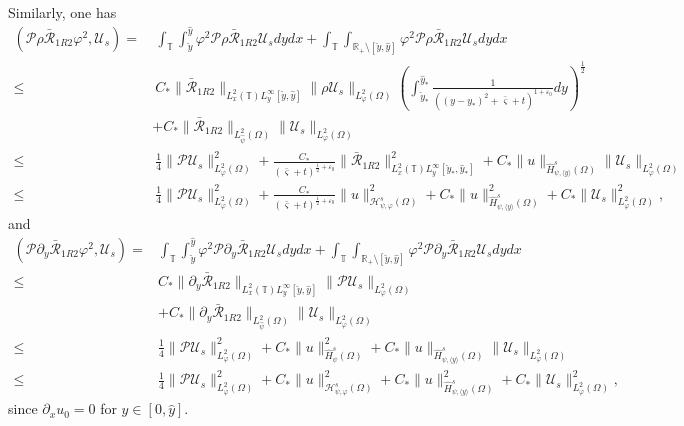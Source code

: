 \documentclass{amsart}
\numberwithin{equation}{section}
\newcommand\y{{{\langle y \rangle}}}
\begin{document}
Similarly, one has
\begin{align}\label{I681}
(\mathcal{P}\rho\bar{\mathcal{R}}_{1R2}\varphi^{2},\mathcal{U}_{s})
=&~\int_{\mathbb{T}}\int_{\check{y}}^{\hat{y}}\varphi^{2}\mathcal{P}\rho\bar{\mathcal{R}}_{1R2}\mathcal{U}_{s}dydx
  +\int_{\mathbb{T}}\int_{\mathbb{R}_{+}\setminus[\check{y},\hat{y}]}\varphi^{2}\mathcal{P}\rho\bar{\mathcal{R}}_{1R2}\mathcal{U}_{s}dydx\\
\leq&~C_{*}\|\bar{\mathcal{R}}_{1R2}\|_{L^{2}_{x}(\mathbb{T})L^{\infty}_{y}[\check{y},\hat{y}]}\|\rho\mathcal{U}_{s}\|_{L_{\varphi}^{2}(\Omega)}
       \left(\int_{\check{y}_{*}}^{\hat{y}_{*}}\frac{1}{((y-y_{*})^2+\bar{\varsigma}+t)^{1+\varepsilon_{0}}}dy\right)^{\frac{1}{2}}\nonumber\\
    &+C_{*}\|\bar{\mathcal{R}}_{1R2}\|_{L_{\hat{\psi}}^{2}(\Omega)}\|\mathcal{U}_{s}\|_{L_{\varphi}^{2}(\Omega)}\nonumber\\
\leq&~\frac{1}{4}\|\mathcal{P}\mathcal{U}_{s}\|_{L_{\varphi}^{2}(\Omega)}^{2}
     +\frac{C_{*}}{(\bar{\varsigma}+t)^{\frac{1}{2}+\varepsilon_{0}}}\|\bar{\mathcal{R}}_{1R2}\|_{L_{x}^{2}(\mathbb{T})L_{y}^{\infty}[\check{y}_{*},\hat{y}_{*}]}^{2}
     +C_{*}\|u\|_{\hat{H}_{\psi,\y}^{s}(\Omega)}\|\mathcal{U}_{s}\|_{L_{\varphi}^{2}(\Omega)}\nonumber\\
\leq&~\frac{1}{4}\|\mathcal{P}\mathcal{U}_{s}\|_{L_{\varphi}^{2}(\Omega)}^{2}
     +\frac{C_{*}}{(\bar{\varsigma}+t)^{\frac{1}{2}+\varepsilon_{0}}}\|u\|_{\mathcal{H}_{\psi,\varphi}^{s}(\Omega)}^{2}
     +C_{*}\|u\|_{\hat{H}_{\psi,\y}^{s}(\Omega)}^{2}
     +C_{*}\|\mathcal{U}_{s}\|_{L_{\varphi}^{2}(\Omega)}^{2}\nonumber,
\end{align}
and
\begin{align}\label{I682}
(\mathcal{P}\partial_{y}\bar{\mathcal{R}}_{1R2}\varphi^{2},\mathcal{U}_{s})
=& \int_{\mathbb{T}}\int_{\check{y}}^{\hat{y}}\varphi^{2}\mathcal{P}\partial_{y}\bar{\mathcal{R}}_{1R2}\mathcal{U}_{s}dydx
  +\int_{\mathbb{T}}\int_{\mathbb{R}_{+}\setminus[\check{y},\hat{y}]}\varphi^{2}\mathcal{P}\partial_{y}\bar{\mathcal{R}}_{1R2}\mathcal{U}_{s}dydx\\
\leq& C_{*}\|\partial_{y}\bar{\mathcal{R}}_{1R2}\|_{L^{2}_{x}(\mathbb{T})L^{\infty}_{y}[\check{y},\hat{y}]}
           \|\mathcal{P}\mathcal{U}_{s}\|_{L_{\varphi}^{2}(\Omega)}\nonumber\\
    &+C_{*}\|\partial_{y}\bar{\mathcal{R}}_{1R2}\|_{L_{\hat{\psi}}^{2}(\Omega)}\|\mathcal{U}_{s}\|_{L_{\varphi}^{2}(\Omega)}\nonumber\\
\leq& \frac{1}{4}\|\mathcal{P}\mathcal{U}_{s}\|_{L_{\varphi}^{2}(\Omega)}^{2}
     +C_{*}\|u\|_{\hat{H}_{\psi}^{s}(\Omega)}^{2}
     +C_{*}\|u\|_{\hat{H}_{\psi,\y}^{s}(\Omega)}\|\mathcal{U}_{s}\|_{L_{\varphi}^{2}(\Omega)}\nonumber\\
\leq& \frac{1}{4}\|\mathcal{P}\mathcal{U}_{s}\|_{L_{\varphi}^{2}(\Omega)}^{2}
     +C_{*}\|u\|_{\mathcal{H}_{\psi,\varphi}^{s}(\Omega)}^{2}
     +C_{*}\|u\|_{\hat{H}_{\psi,\y}^{s}(\Omega)}^{2}
     +C_{*}\|\mathcal{U}_{s}\|_{L_{\varphi}^{2}(\Omega)}^{2}\nonumber,
\end{align}
since $\partial_{x}u_{0}=0$ for $y\in[0,\hat{y}]$.
\end{document}
